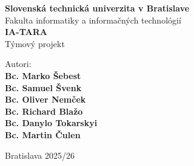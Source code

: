 \begin{titlepage}
    \begin{center}

        {\Large \textbf{Slovenská technická univerzita v Bratislave}}\\[0.3cm]
        {\large Fakulta informatiky a informačných technológií}\\[7cm]

        {\Huge \textbf{IA-TARA}}\\[0.5cm]
        {\Large Týmový projekt}\\[10cm]

        \begin{flushleft}
            \large
            Autori:\\
            \textbf{Bc. Marko Šebest} \\
            \textbf{Bc. Samuel Švenk} \\
            \textbf{Bc. Oliver Nemček} \\
            \textbf{Bc. Richard Blažo} \\
            \textbf{Bc. Danylo Tokarskyi} \\
            \textbf{Bc. Martin Čulen} \\
        \end{flushleft}

        \vfill

        {\large Bratislava \hfill 2025/26}

    \end{center}
\end{titlepage}
